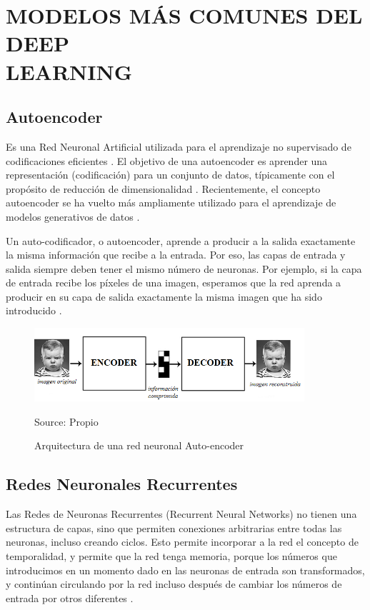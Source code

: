 \section{MODELOS MÁS COMUNES DEL DEEP \\LEARNING}
\subsection{Autoencoder}
Es una Red Neuronal Artificial utilizada para el aprendizaje no supervisado
de codificaciones eficientes . El objetivo de una autoencoder es aprender una
representación (codificación) para un conjunto de datos, típicamente con el propósito
de reducción de dimensionalidad . Recientemente, el concepto autoencoder se ha vuelto
más ampliamente utilizado para el aprendizaje de modelos generativos de datos \cite{28fAutoencoder}.

Un auto-codificador, o autoencoder, aprende a producir a la salida exactamente la
misma información que recibe a la entrada. Por eso, las capas de entrada y salida siempre
deben tener el mismo número de neuronas. Por ejemplo, si la capa de entrada recibe los
píxeles de una imagen, esperamos que la red aprenda a producir en su capa de salida
exactamente la misma imagen que ha sido introducido \cite{18restrepo2015aplicacion}.

\begin{figure}[H]
		\centering
		\includegraphics[width=100mm]{./Imagenes/autoenconder.png}
		\caption{Arquitectura de una red neuronal Auto-encoder}
		Source: Propio
		\label{fig:autoencoder}
\end{figure}

\subsection{Redes Neuronales Recurrentes}
Las Redes de Neuronas Recurrentes (Recurrent Neural Networks) no tienen una
estructura de capas, sino que permiten conexiones arbitrarias entre todas las neuronas,
incluso creando ciclos. Esto permite incorporar a la red el concepto de temporalidad, y
permite que la red tenga memoria, porque los números que introducimos en un momento
dado en las neuronas de entrada son transformados, y continúan circulando por la red
incluso después de cambiar los números de entrada por otros diferentes \cite{18restrepo2015aplicacion}.


